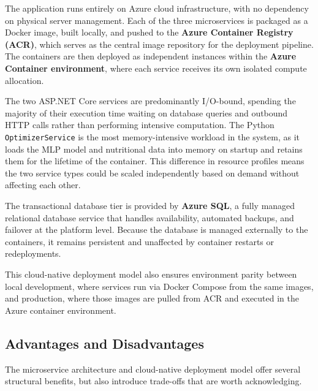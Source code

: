 The application runs entirely on Azure cloud infrastructure, with no dependency on
physical server management. Each of the three microservices is packaged as a
Docker image, built locally, and pushed to the \textbf{Azure Container Registry (ACR)},
which serves as the central image repository for the deployment pipeline. The containers
are then deployed as independent instances within the \textbf{Azure Container environment},
where each service receives its own isolated compute allocation.

The two ASP.NET Core services are predominantly I/O-bound, spending the majority of
their execution time waiting on database queries and outbound HTTP calls rather than
performing intensive computation. The Python \texttt{OptimizerService} is the most memory-intensive workload in the
system, as it loads the MLP model and nutritional data into memory on startup and
retains them for the lifetime of the container. This difference in resource profiles means the two service types
could be scaled independently based on demand without affecting each other.

The transactional database tier is provided by \textbf{Azure SQL}, a fully managed
relational database service that handles availability, automated backups, and failover
at the platform level. Because the database is managed externally to the containers,
it remains persistent and unaffected by container restarts or redeployments.

This cloud-native deployment model also ensures environment parity between local
development, where services run via Docker Compose from the same images, and
production, where those images are pulled from ACR and executed in the Azure
container environment.

\subsection{Advantages and Disadvantages}

The microservice architecture and cloud-native deployment model offer several structural
benefits, but also introduce trade-offs that are worth acknowledging.

